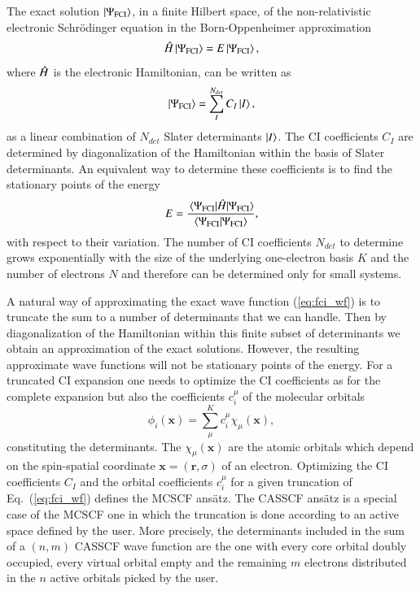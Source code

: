\documentclass[aps,prb,reprint,showkeys,superscriptaddress]{revtex4-1}
\begin{document}
The exact solution $\ket{\Psi_{\text{FCI}}}$, in a finite Hilbert space, of the non-relativistic electronic Schr\"odinger equation in the Born-Oppenheimer approximation
\begin{equation}
  \label{eq:schro_eq}
  \Hat{H} \ket{\Psi_{\text{FCI}}} = E \ket{\Psi_{\text{FCI}}},
\end{equation}
where $\Hat{H}$ is the electronic Hamiltonian, can be written as \cite{Szabo_1996}
\begin{equation}
  \label{eq:fci_wf}
  \ket{\Psi_{\text{FCI}}} = \sum_I^{N_{det}} C_I\ket{I},
\end{equation}
\ie as a linear combination of $N_{det}$ Slater determinants $\ket{I}$.
The CI coefficients $C_I$ are determined by diagonalization of the Hamiltonian within the basis of Slater determinants.
An equivalent way to determine these coefficients is to find the stationary points of the energy
\begin{equation}
  \label{eq:fci_nrj}
  E = \frac{\mel{\Psi_{\text{FCI}}}{\Hat{H}}{\Psi_{\text{FCI}}}}{\braket{\Psi_{\text{FCI}}}{\Psi_{\text{FCI}}}},
\end{equation}
 with respect to their variation.
The number of CI coefficients $N_{det}$ to determine grows exponentially with the size of the underlying one-electron basis $K$ and the number of electrons $N$ and therefore can be determined only for small systems.

A natural way of approximating the exact wave function (\ref{eq:fci_wf}) is to truncate the sum to a number of determinants that we can handle. Then by diagonalization of the Hamiltonian within this finite subset of determinants we obtain an approximation of the exact solutions.
However, the resulting approximate wave functions will not be stationary points of the energy.
For a truncated CI expansion one needs to optimize the CI coefficients as for the complete expansion but also the coefficients $c_i^\mu$ of the molecular orbitals
\begin{equation}
  \label{eq:mo}
  \phi_i(\bm{x}) = \sum^K_\mu c_i^\mu \chi_{\mu}(\bm{x}),
\end{equation}
constituting the determinants. The $\chi_{\mu}(\bm{x})$ are the atomic orbitals which depend on the spin-spatial coordinate $\bm{x} = (\bm{r},\sigma)$ of an electron.
Optimizing the CI coefficients $C_I$ and the orbital coefficients $c_i^\mu$ for a given truncation of Eq.~(\ref{eq:fci_wf}) defines the MCSCF ans\"atz.
The CASSCF ans\"atz is a special case of the MCSCF one in which the truncation is done according to an active space defined by the user.
More precisely, the determinants included in the sum of a $(n,m)$ CASSCF wave function are the one with every core orbital doubly occupied, every virtual orbital empty and the remaining $m$ electrons distributed in the $n$ active orbitals picked by the user.
\end{document}
